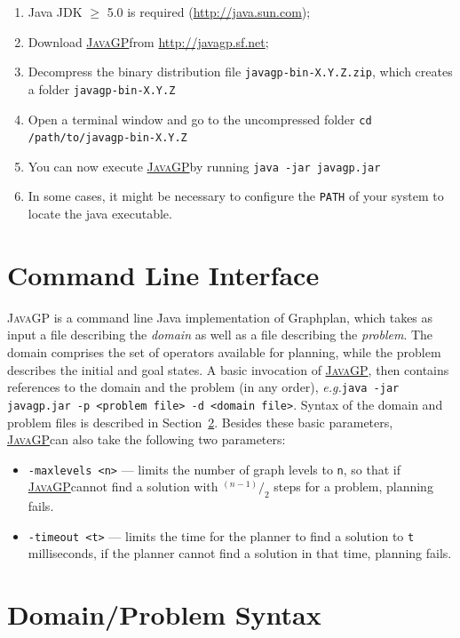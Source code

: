 \documentclass[]{article}
\newcommand\exempli{\emph{e.g.}}
\newcommand\javagp{\href{http://javagp.sf.net}{\textsc{JavaGP}}}
\begin{document}
\begin{enumerate}
\item Java JDK $\geq$ 5.0 is required (\url{http://java.sun.com});
\item Download \javagp from \url{http://javagp.sf.net};
\item Decompress the binary distribution file \texttt{javagp-bin-X.Y.Z.zip}, which creates a folder \texttt{javagp-bin-X.Y.Z}
\item Open a terminal window and go to the uncompressed folder \texttt{cd /path/to/javagp-bin-X.Y.Z}
\item You can now execute \javagp by running \texttt{java -jar javagp.jar}
\item In some cases, it might be necessary to configure the \texttt{PATH} of your system to locate the java executable.
\end{enumerate}

\section{Command Line Interface}
\label{sec:interface}

\textsc{JavaGP} is a command line Java implementation of Graphplan, which takes as input a file describing the \emph{domain} as well as a file describing the \emph{problem}. 
The domain comprises the set of operators available for planning, while the problem describes the initial and goal states. 
A basic invocation of \javagp, then contains references to the domain and the problem (in any order), \exempli \texttt{java -jar javagp.jar -p <problem file> -d <domain file>}. 
Syntax of the domain and problem files is described in Section~\ref{sec:syntax}.
Besides these basic parameters, \javagp can also take the following two parameters:
\begin{itemize}
	\item \texttt{-maxlevels <n>} --- limits the number of graph levels to \texttt{n}, so that if \javagp cannot find a solution with $^{(n-1)}/_{2}$ steps for a problem, planning fails.
	\item \texttt{-timeout <t>} --- limits the time for the planner to find a solution to \texttt{t} milliseconds, if the planner cannot find a solution in that time, planning fails.
\end{itemize}

\section{Domain/Problem Syntax}
\label{sec:syntax}



\end{document}

